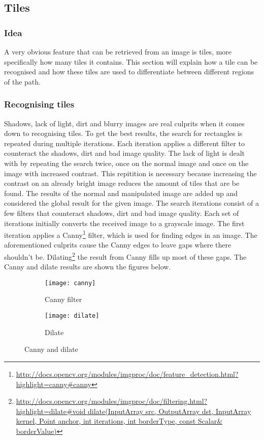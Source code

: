 \clearpage
\subsection{Tiles}
\subsubsection{Idea}
A very obvious feature that can be retrieved from an image is tiles, more specifically how many tiles it contains. This section will explain how a tile can be recognised and how these tiles are used to differentiate between different regions of the path. 
\subsubsection{Recognising tiles}
Shadows, lack of light, dirt  and blurry images are real culprits when it comes down to recognising tiles. To get the best results, the search for rectangles is repeated during multiple iterations. Each iteration applies a different filter to counteract the shadows, dirt and bad image quality. The lack of light is dealt with by repeating the search twice, once on the normal image and once on the image with increased contrast. This repitition is necessary because increasing the contrast on an already bright image reduces the amount of tiles that are be found. The results of the normal and manipulated image are added up and considered the global result for the given image. 
\npar
The search iterations  consist of a few filters that counteract shadows, dirt and bad image quality. Each set of iterations initially converts the received image to a grayscale image. The first iteration applies a Canny\footnote{\url{http://docs.opencv.org/modules/imgproc/doc/feature_detection.html?highlight=canny\#canny}} filter, which is used for finding edges in an image. The aforementioned culprits cause the Canny edges to leave gaps where there shouldn't be. Dilating\footnote{\url{http://docs.opencv.org/modules/imgproc/doc/filtering.html?highlight=dilate\#void dilate(InputArray src, OutputArray dst, InputArray kernel, Point anchor, int iterations, int borderType, const Scalar& borderValue)}} the result from Canny fills up most of these gaps. The Canny and dilate results are shown the figures below.  

\begin{figure}[ht]
\centering
\begin{subfigure}{.5\textwidth}
  \centering
  \texttt{[image: canny]}
  \caption{Canny filter\label{canny}}
\end{subfigure}%
\begin{subfigure}{.5\textwidth}
  \centering
  \texttt{[image: dilate]}
  \caption{Dilate\label{dilate}}
\end{subfigure}
\caption{Canny and dilate\label{canny_dilate}}
\end{figure}

